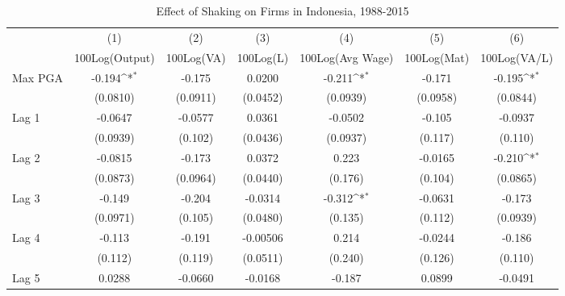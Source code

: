 \begin{table}[htbp]\centering
\def\sym#1{\ifmmode^{#1}\else\(^{#1}\)\fi}
\caption{Effect of Shaking on Firms in Indonesia, 1988-2015}
\begin{tabular}{l*{6}{c}}
\toprule
                &\multicolumn{1}{c}{(1)}&\multicolumn{1}{c}{(2)}&\multicolumn{1}{c}{(3)}&\multicolumn{1}{c}{(4)}&\multicolumn{1}{c}{(5)}&\multicolumn{1}{c}{(6)}\\
                &\multicolumn{1}{c}{100Log(Output)}&\multicolumn{1}{c}{100Log(VA)}&\multicolumn{1}{c}{100Log(L)}&\multicolumn{1}{c}{100Log(Avg Wage)}&\multicolumn{1}{c}{100Log(Mat)}&\multicolumn{1}{c}{100Log(VA/L)}\\
\midrule
Max PGA         &   -0.194\sym{*}  &   -0.175         &   0.0200         &   -0.211\sym{*}  &   -0.171         &   -0.195\sym{*}  \\
                & (0.0810)         & (0.0911)         & (0.0452)         & (0.0939)         & (0.0958)         & (0.0844)         \\
\addlinespace
Lag 1           &  -0.0647         &  -0.0577         &   0.0361         &  -0.0502         &   -0.105         &  -0.0937         \\
                & (0.0939)         &  (0.102)         & (0.0436)         & (0.0937)         &  (0.117)         &  (0.110)         \\
\addlinespace
Lag 2           &  -0.0815         &   -0.173         &   0.0372         &    0.223         &  -0.0165         &   -0.210\sym{*}  \\
                & (0.0873)         & (0.0964)         & (0.0440)         &  (0.176)         &  (0.104)         & (0.0865)         \\
\addlinespace
Lag 3           &   -0.149         &   -0.204         &  -0.0314         &   -0.312\sym{*}  &  -0.0631         &   -0.173         \\
                & (0.0971)         &  (0.105)         & (0.0480)         &  (0.135)         &  (0.112)         & (0.0939)         \\
\addlinespace
Lag 4           &   -0.113         &   -0.191         & -0.00506         &    0.214         &  -0.0244         &   -0.186         \\
                &  (0.112)         &  (0.119)         & (0.0511)         &  (0.240)         &  (0.126)         &  (0.110)         \\
\addlinespace
Lag 5           &   0.0288         &  -0.0660         &  -0.0168         &   -0.187         &   0.0899         &  -0.0491         \\

\end{tabular}
\end{table}
